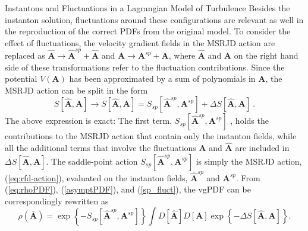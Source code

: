 \begin{chapter}{Instantons and Fluctuations in a Lagrangian Model of Turbulence}
Besides the instanton solution, fluctuations around these configurations are relevant as well in the reproduction of the correct PDFs from the original model. To consider the effect of fluctuations, the velocity gradient fields in the MSRJD action are replaced as
$\hat {\mathbf{A}} \rightarrow \hat {\mathbf{A}}^{sp} + \hat {\mathbf{A}}$ and ${\mathbf{A}} \rightarrow {\mathbf{A}}^{sp} + {\mathbf{A}}$,
where $\hat {\mathbf{A}}$ and ${\mathbf{A}}$ on the right hand side of these transformations refer to the fluctuation contributions. Since the potential $V(\mathbf{A})$ has been approximated by a sum of polynomials in $\mathbf{A}$, the MSRJD action can be split in the form
\begin{equation}
 S[\hat {\mathbf{A}}, {\mathbf{A}}] \rightarrow S[\hat {\mathbf{A}}, {\mathbf{A}}] = S_{sp}[\hat {\mathbf{A}}^{sp}, {\mathbf{A}}^{sp}] + \Delta S[\hat {\mathbf{A}}, {\mathbf{A}}] \label{sp_fluct} \ .
\end{equation}
The above expression is exact: The first term, $ S_{sp}[\hat {\mathbf{A}}^{sp}, {\mathbf{A}}^{sp}] $ , holds the contributions to the MSRJD action that contain only the instanton fields, while all the additional terms that involve the fluctuations ${\mathbf{A}}$ and $\hat {\mathbf{A}}$ are included in $\Delta S[\hat {\mathbf{A}}, {\mathbf{A}}]$.
The saddle-point action $S_{sp}[\hat {\mathbf{A}}^{sp}, {\mathbf{A}}^{sp}]$ is simply the 
MSRJD action, (\ref{eq:rfd-action}), evaluated on the instanton
fields, $\hat {\mathbf{A}}^{sp}$ and ${\mathbf{A}}^{sp}$.
From (\ref{eq:rhoPDF}), (\ref{asymptPDF}), and (\ref{sp_fluct}), the vgPDF can be correspondingly rewritten as
\begin{equation}
 \rho(\bar {\mathbf{A}}) = \exp \left\{ -S_{sp}[\hat {\mathbf{A}}^ {sp}, {\mathbf{A}}^ {sp}] \right\} \int D[\hat {\mathbf{A}}] D[{\mathbf{A}}] \exp \left\{ -\Delta S[\hat {\mathbf{A}}, {\mathbf{A}}] \right\} \mbox{.}
\end{equation}


\end{chapter}
